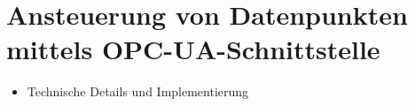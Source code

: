 \section{Ansteuerung von Datenpunkten mittels OPC-UA-Schnittstelle}
\label{ch_04Ansteuerung von Datenpunkten mittels OPC-UA-Schnittstelle}
\begin{itemize}
	\item Technische Details und Implementierung
\end{itemize}